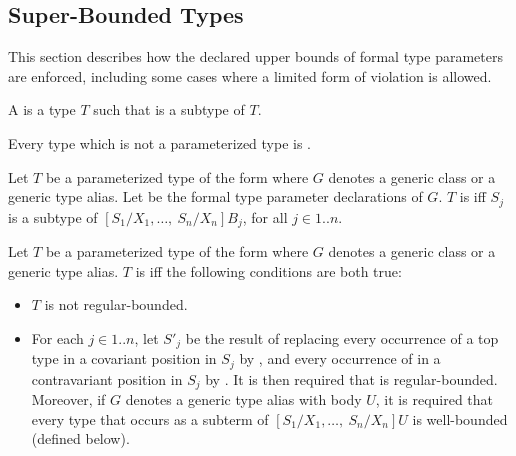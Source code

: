 \documentclass[makeidx]{article}
\begin{document}
\subsection{Super-Bounded Types}

\LMHash{}%
This section describes how
the declared upper bounds of formal type parameters are enforced,
including some cases where a limited form of violation is allowed.

\LMHash{}%
A  is a type $T$ such that  is a subtype of $T$.


\LMHash{}%
Every type which is not a parameterized type is .


\LMHash{}%
Let $T$ be a parameterized type of the form
where $G$ denotes a generic class or a generic type alias.
Let
be the formal type parameter declarations of $G$.
$T$ is  if{}f
$S_j$ is a subtype of
$[S_1/X_1, \ldots,\ S_n/X_n]B_j$,
for all $j \in 1 .. n$.


\LMHash{}%
Let $T$ be a parameterized type of the form
where $G$ denotes a generic class or a generic type alias.
$T$ is  if{}f the following conditions are both true:

\begin{itemize}
\item
  $T$ is not regular-bounded.
\item
  For each $j \in 1 .. n$, let $S'_j$ be the result of replacing
  every occurrence of a top type
  in a covariant position in $S_j$ by ,
  and every occurrence of 
  in a contravariant position in $S_j$ by .
  It is then required that
  is regular-bounded.
  Moreover, if $G$ denotes a generic type alias with body $U$,
  it is required that every type that occurs as a subterm of
  $[S_1/X_1, \ldots,\ S_n/X_n]U$
  is well-bounded (defined below).
\end{itemize}
\end{document}
